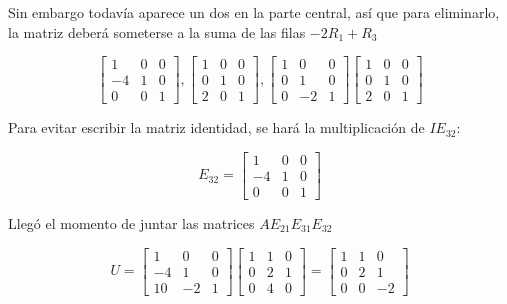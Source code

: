 \begin{enumerate}
	      Sin embargo todavía aparece un dos en la parte central, así que para eliminarlo, la matriz deberá someterse a la suma de las filas $-2R_{1}+R_{3}$


	      \begin{equation*}
		      \begin{bmatrix} 1& 0& 0\\ -4& 1& 0 \\0& 0& 1 \end{bmatrix},\begin{bmatrix} 1& 0& 0\\ 0& 1& 0 \\2& 0& 1 \end{bmatrix}, \begin{bmatrix}1& 0& 0\\ 0& 1& 0 \\0& -2& 1 \end{bmatrix}\begin{bmatrix}
			      1 & 0 & 0 \\ 0& 1& 0 \\2& 0& 1
		      \end{bmatrix}
	      \end{equation*}

	      Para evitar escribir la matriz identidad, se hará la multiplicación de $IE_{32}$:

	      \begin{equation*}
		      E_{32}= \begin{bmatrix} 1& 0& 0\\ -4& 1& 0 \\0& 0& 1 \end{bmatrix}
	      \end{equation*}

	      Llegó el momento de juntar las matrices $AE_{21}E_{31}E_{32}$

	      \begin{equation*}
		      U= \begin{bmatrix}
			      1 & 0 & 0 \\ -4& 1& 0 \\10& -2& 1
		      \end{bmatrix} \begin{bmatrix}
			      1 & 1 & 0 \\ 0& 2& 1 \\ 0 &4 &0
		      \end{bmatrix}= \begin{bmatrix}
			      1 & 1 & 0 \\ 0& 2& 1 \\ 0 &0 &-2
		      \end{bmatrix}
	      \end{equation*}


\end{enumerate}
